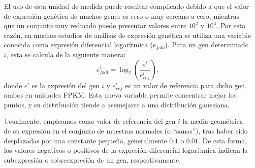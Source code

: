El uso de esta unidad de medida puede resultar complicado debido a que el valor de expresión genética de muchos genes es cero o muy cercano a cero, mientras que un conjunto muy reducido puede presentar valores entre $10^2$ y $10^4$. Por esta razón, en muchos estudios de análisis de expresión genética se utiliza una variable conocida como expresión diferencial logarítmica ($e_{fold}$). Para un gen determinado $i$, esta se calcula de la siguiente manera:
\begin{equation}
	e^i_{fold} = \log_2\left(\frac{e^i}{e^{i}_{ref}}\right),
\end{equation}
donde $e^i$ es la expresión del gen $i$ y $e^i_{ref}$ es un valor de referencia para dicho gen, ambos en unidades FPKM. Esta nueva variable permite concentrar mejor los puntos, y su distribución tiende a asemejarse a una distribución gaussiana. 

Usualmente, empleamos como valor de referencia del gen $i$ la media geométrica de su expresión en el conjunto de muestras normales (o ``sanas''), tras haber sido desplazadas por una constante pequeña, generalmente $0.1$ o $0.01$. De esta forma, los valores negativos o positivos de la expresión diferencial logarítmica indican la subexpresión o sobreexpresión de un gen, respectivamente.